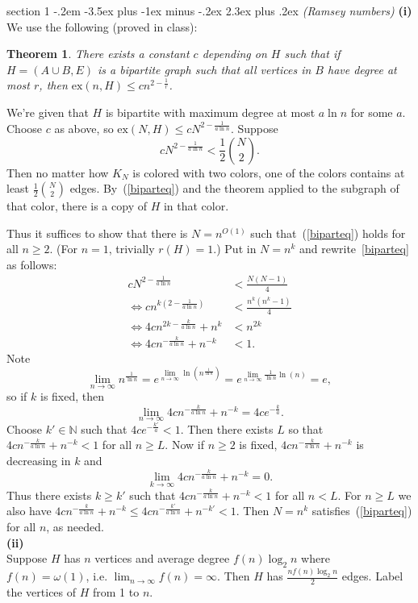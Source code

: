 \documentclass[12pt]{article}
\makeatletter
\theoremstyle{norm}
\newtheorem{thm}{Theorem}[section]
\newcommand{\N}[0]{\mathbb{N}}
\newcommand{\rc}[1]{\frac{1}{#1}}
\newcommand{\pa}[1]{\left( {#1} \right)}
\newcommand{\subprob}[1]{\noindent\textbf{#1}\\}
\newcommand{\iy}[0]{\infty}
\newenvironment{problem}{\@startsection
       {section}
       {1}
       {-.2em}
       {-3.5ex plus -1ex minus -.2ex}
       {2.3ex plus .2ex}
       {\pagebreak[3]%
       \large\bf\noindent{Problem }
       }
       }
       {%
       }
\makeatother
\begin{document}
\begin{problem} {\it (Ramsey numbers)}
\subprob{(i)}
We use the following (proved in class):
\begin{thm}
There exists a constant $c$ depending on $H$ such that if $H=(A\cup B,E)$ is a bipartite graph such that all vertices in $B$ have degree at most $r$, then $\text{ex}(n,H)\le cn^{2-\rc r}$. 
\end{thm}
We're given that $H$ is bipartite with maximum degree at most $a\ln n$ for some $a$. Choose $c$ as above, so $\text{ex}(N,H)\le cN^{2-\rc {a\ln n}}$.  Suppose 
\begin{equation}\label{biparteq}
cN^{2-\rc {a\ln n}}<\rc{2}\binom N2.
\end{equation}
Then no matter how $K_N$ is colored with two colors, one of the colors contains at least $\rc{2}\binom N2$ edges. By~(\ref{biparteq}) and the theorem applied to the subgraph of that color, there is a copy of $H$ in that color.

Thus it suffices to show that there is $N=n^{O(1)}$ such that~(\ref{biparteq}) holds for all $n\ge 2$. (For $n=1$, trivially $r(H)=1$.) Put in $N=n^k$ and rewrite~\ref{biparteq} as follows:
\begin{align*}
cN^{2-\rc{a\ln n}}&<\frac{N(N-1)}{4}\\
\iff cn^{k\pa{2-\rc{a\ln n}}}&<\frac{n^k(n^k-1)}{4}\\
\iff 4cn^{2k-\frac{k}{a\ln n}}+{n^k}&<n^{2k}\\
\iff 4cn^{-\frac {k}{a\ln n}}+n^{-k}&<1.
\end{align*}
Note
\[\lim_{n\to \iy} n^{\rc{\ln n}}=e^{\lim_{n\to \iy} \ln \pa{n^{\rc{\ln n}}}}
=e^{\lim_{n\to \iy} \rc{\ln n}\ln (n)}
=e,\]
so if $k$ is fixed, then
\[
\lim_{n\to \iy} 4cn^{-\frac{k}{a\ln n}}+n^{-k}=4ce^{-\frac k{a}}.
\]
Choose $k'\in \N$ such that $4ce^{-\frac {k'}{a}}<1$. Then there exists $L$ so that $4cn^{-\frac{k}{a\ln n}}+n^{-k}<1$ for all $n\ge L$. Now if $n\ge 2$ is fixed, $4cn^{-\frac{k}{a\ln n}}+n^{-k}$ is decreasing in $k$ and 
\[
\lim_{k\to \iy} 4cn^{-\frac{k}{a\ln n}}+n^{-k}=0.
\]
Thus there exists $k\ge k'$ such that $4cn^{-\frac{k}{a\ln n}}+n^{-k}<1$ for all $n<L$. For $n\ge L$ we also have $4cn^{-\frac{k}{a\ln n}}+n^{-k}\le 4cn^{-\frac{k'}{a\ln n}}+n^{-k'}<1$. Then $N=n^k$ satisfies~(\ref{biparteq}) for all $n$, as needed.\\

\subprob{(ii)}
Suppose $H$ has $n$ vertices and average degree $f(n)\log_2 n$ where $f(n)=\omega(1)$, i.e. $\lim_{n\to \iy}f(n)=\iy$. Then $H$ has $\frac{nf(n)\log_2 n}{2}$ edges. Label the vertices of $H$ from 1 to $n$.


\end{problem}
\end{document}
